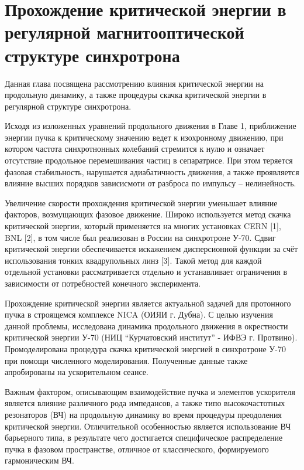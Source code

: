 
	\chapter{Прохождение критической энергии в регулярной магнитооптической структуре синхротрона}\label{ch:transition_jump}

\par Данная глава посвящена рассмотрению влияния критической энергии на продольную динамику, а также процедуры скачка критической энергии в регулярной структуре синхротрона.

\par Исходя из изложенных уравнений продольного движения в Главе 1, приближение энергии пучка к критическому значению ведет к изохронному движению, при котором частота синхротнонных колебаний стремится к нулю и означает отсутствие продольное перемешивания частиц в сепаратрисе. При этом теряется фазовая стабильность, нарушается адиабатичность движения, а также проявляется влияние высших порядков зависисмоти от разброса по импульсу – нелинейность.

\par Увеличение скорости прохождения критической энергии уменьшает влияние факторов, возмущающих фазовое движение. Широко используется метод скачка критической энергии, который применяется на многих установках CERN [1], BNL [2], в том числе был реализован в России на синхротроне У-70. Сдвиг критической энергии обеспечивается искажением дисперсионной функции за счёт использования тонких квадрупольных линз [3]. Такой метод для каждой отдельной установки рассматривается отдельно и устанавливает ограничения в зависимости от потребностей конечного эксперимента.

\par Прохождение критической энергии является актуальной задачей для протонного пучка в строящемся комплексе NICA (ОИЯИ г. Дубна). С целью изучения данной проблемы, исследована динамика продольного движения в окрестности критической энергии У-70 (НИЦ “Курчатовский институт” - ИФВЭ г. Протвино).  Промоделирована процедура скачка критической энергией в синхротроне У-70 при помощи численного моделирования. Полученные данные также апробированы на ускорительном сеансе.

\par Важным фактором, описывающим взаимодействие пучка и элементов ускорителя является влияние различного рода импедансов, а также типо высокочастотных резонаторов (ВЧ) на продольную динамику во время процедуры преодоления критической энергии. Отличительной особенностью является использование ВЧ барьерного типа, в результате чего достигается специфическое распределение пучка в фазовом пространстве, отличное от классического, формируемого гармоническим ВЧ.

